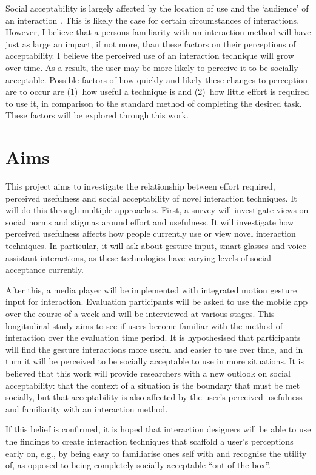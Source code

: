 \documentclass{l4proj}
\begin{document}
Social acceptability is largely affected by the location of use and the `audience' of an interaction \citep{rico_usable_2010}. This is likely the case for certain circumstances of interactions. However, I believe that a persons familiarity with an interaction method will have just as large an impact, if not more, than these factors on their perceptions of acceptability. I believe the perceived use of an interaction technique will grow over time. As a result, the user may be more likely to perceive it to be socially acceptable. Possible factors of how quickly and likely these changes to perception are to occur are (1)~how useful a technique is and (2)~how little effort is required to use it, in comparison to the standard method of completing the desired task. These factors will be explored through this work.

\section{Aims}

This project aims to investigate the relationship between effort required, perceived usefulness and social acceptability of novel interaction techniques. It will do this through multiple approaches. First, a survey will investigate views on social norms and stigmas around effort and usefulness. It will investigate how perceived usefulness affects how people currently use or view novel interaction techniques. In particular, it will ask about gesture input, smart glasses and voice assistant interactions, as these technologies have varying levels of social acceptance currently.

After this, a media player will be implemented with integrated motion gesture input for interaction. Evaluation participants will be asked to use the mobile app over the course of a week and will be interviewed at various stages. This longitudinal study aims to see if users become familiar with the method of interaction over the evaluation time period. It is hypothesised that participants will find the gesture interactions more useful and easier to use over time, and in turn it will be perceived to be socially acceptable to use in more situations. It is believed that this work will provide researchers with a new outlook on social acceptability: that the context of a situation is the boundary that must be met socially, but that acceptability is also affected by the user's perceived usefulness and familiarity with an interaction method.

If this belief is confirmed, it is hoped that interaction designers will be able to use the findings to create interaction techniques that scaffold a user's perceptions early on, e.g., by being easy to familiarise ones self with and recognise the utility of, as opposed to being completely socially acceptable ``out of the box''. 
\end{document}
